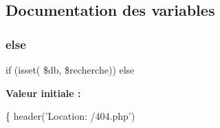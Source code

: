 \subsection{Documentation des variables}
\mbox{\label{recherche_8php_aae62501ff78988f2486e1c1ba9157b61}} 
\subsubsection{\texorpdfstring{else}{else}}
{\footnotesize\ttfamily if (isset( \$db, \$recherche)) else}

{\bfseries Valeur initiale \+:}
\begin{DoxyCode}
\{
    header(\textcolor{stringliteral}{'Location: /404.php'})
\end{DoxyCode}

